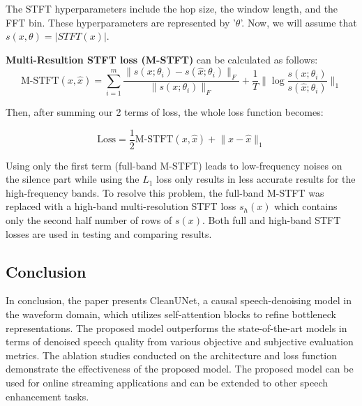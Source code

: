 The STFT hyperparameters include the hop size, the window length, and the FFT bin. These hyperparameters are represented by '$\theta$'. Now, we will assume that $s(x,\theta) = \vert STFT(x) \vert$.

\textbf{Multi-Resultion STFT loss (M-STFT)} can be calculated as follows:
\begin{equation}
    \text{M-STFT}(x,\hat{x}) = \sum_{i = 1}^{m} \frac{\lVert s(x;\theta_i) - s(\hat{x};\theta_i) \rVert_F}{\lVert s(x;\theta_i) \rVert_F} + \frac{1}{T} \lVert \log{\frac{s(x;\theta_i)}{s(\hat{x};\theta_i)}} \rVert_1
\end{equation}

Then, after summing our 2 terms of loss, the whole loss function becomes:

\begin{equation}
    \text{Loss} = \frac{1}{2} \text{M-STFT}(x,\hat{x}) + \lVert x - \hat{x} \rVert_1
\end{equation}

Using only the first term (full-band M-STFT) leads to low-frequency noises on the silence part while using the $L_1$ loss only results in less accurate results for the high-frequency bands.
To resolve this problem, the full-band M-STFT was replaced with a high-band multi-resolution STFT loss $s_h(x)$ which contains only the second half number of rows of $s(x)$.
Both full and high-band STFT losses are used in testing and comparing results.


\subsection{Conclusion}
In conclusion, the paper presents CleanUNet, a causal speech-denoising model in the waveform domain, which utilizes self-attention blocks to refine bottleneck representations. The proposed model outperforms the state-of-the-art models in terms of denoised speech quality from various objective and subjective evaluation metrics. The ablation studies conducted on the architecture and loss function demonstrate the effectiveness of the proposed model. The proposed model can be used for online streaming applications and can be extended to other speech enhancement tasks.




